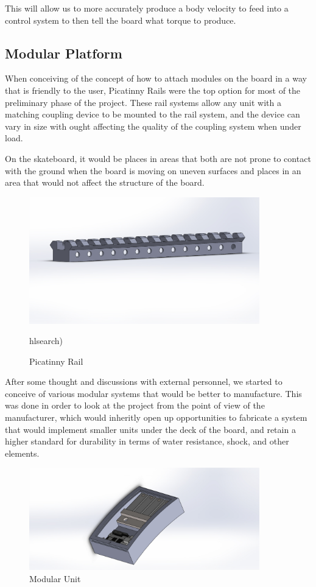 \documentclass[titlepage, letterpaper,12pt]{article}
\begin{document}
This will allow us to more accurately produce a body velocity to feed into a control system to then tell the board what torque to produce.

\subsection{Modular Platform}
When conceiving of the concept of how to attach modules on the board in a way that is friendly to the user, Picatinny Rails were the top option for most of the preliminary phase of the project. These rail systems allow any unit with a matching coupling device to be mounted to the rail system, and the device can vary in size with ought affecting the quality of the coupling system when under load.

On the skateboard, it would be places in areas that both are not prone to contact with the ground when the board is moving on uneven surfaces and places in an area that would not affect the structure of the board.

\begin{figure}[h]
    \centering
    \includegraphics[width=10cm]{figs/Picatinny_Rail.JPG}
    \caption{Picatinny Rail}
    \label{fig:picTiny0}
    hlsearch)
\end{figure}

After some thought and discussions with external personnel, we started to conceive of various modular systems that would be better to manufacture. This was done in order to look at the project from the point of view of the manufacturer, which would inheritly open up opportunities to fabricate a system that would implement smaller units under the deck of the board, and retain a higher standard for durability in terms of water resistance, shock, and other elements.

\begin{figure}[!h]
    \centering
    \includegraphics[width=10cm]{figs/ModPieceAngle.JPG}
    \caption{Modular Unit}
    \label{fig:picTiny1}
\end{figure}
\end{document}
